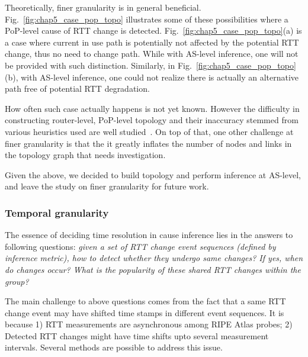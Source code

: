 Theoretically, finer granularity is in general beneficial. Fig.~\ref{fig:chap5_case_pop_topo} illustrates some of these possibilities where a PoP-level cause of RTT change is detected.
Fig.~\ref{fig:chap5_case_pop_topo}(a) is a case where current in use path is potentially not affected by the potential RTT change, thus no need to change path. While with AS-level inference, one will not be provided with such distinction. 
Similarly, in Fig.~\ref{fig:chap5_case_pop_topo}(b), with AS-level inference, one could not realize there is actually an alternative path free of potential RTT degradation.

How often such case actually happens is not yet known. However the difficulty in constructing router-level, PoP-level topology and their inaccuracy stemmed from various heuristics used are well studied~\cite{Donnet2007, shavitt2013internet, fressancourt2016}.
On top of that, one other challenge at finer granularity is that the it greatly inflates the number of nodes and links in the topology graph that needs investigation.

Given the above, we decided to build topology and perform inference at AS-level, and leave the study on finer granularity for future work.

\subsubsection{Temporal granularity}
The essence of deciding time resolution in cause inference lies in the answers to following questions: \textit{given a set of RTT change event sequences (defined by inference metric), how to detect whether they undergo same changes? If yes, when do changes occur? What is the popularity of these shared RTT changes within the group?}

The main challenge to above questions comes from the fact that a same RTT change event may have shifted time stamps in different event sequences. It is because 1) RTT measurements are asynchronous among RIPE Atlas probes; 2) Detected RTT changes might have time shifts upto several measurement intervals.
Several methods are possible to address this issue.


